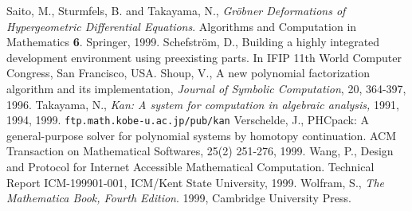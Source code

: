 \begin{thebibliography}{X}
Saito, M., Sturmfels, B. and Takayama, N.,
{\it Gr\"obner Deformations of Hypergeometric Differential Equations}.
Algorithms and Computation in Mathematics {\bf 6}. Springer, 1999.
Schefstr\"om, D.,
Building a highly integrated development environment using
preexisting parts.
In IFIP 11th World Computer Congress, San Francisco, USA.
Shoup, V., 
A new polynomial factorization algorithm and 
its implementation,
{\sl Journal of Symbolic Computation}, 20, 364-397, 1996.
	Takayama, N.,
	{\em Kan: A system for computation in
	algebraic analysis,} 1991, 1994, 1999.
	{\small {\tt ftp.math.kobe-u.ac.jp/pub/kan}}
Verschelde, J.,
PHCpack: A general-purpose solver for polynomial systems by
homotopy continuation.  ACM Transaction on Mathematical Softwares, 25(2) 
251-276, 1999.
Wang, P.,
Design and Protocol for Internet Accessible Mathematical Computation.
Technical Report ICM-199901-001, ICM/Kent State University, 1999.
Wolfram, S.,
{\it The Mathematica Book, Fourth Edition}.
1999, Cambridge University Press.
\end{thebibliography}
